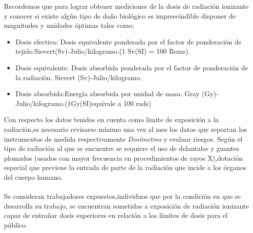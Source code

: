 \documentclass[12pt,fleqn]{book} %
\numberwithin{equation}{section} %
\numberwithin{figure}{section} %
\numberwithin{table}{section} %
\begin{document}
{{}%
Recordemos que para lograr obtener mediciones de la dosis de radiación ionizante y conocer si existe algún tipo de  daño biológico es imprescindible 
disponer  de magnitudes y  unidades óptimas tales como;
\begin{itemize}
 \item 
Dosis efectiva: Dosis equivalente ponderada por el factor de ponderación de tejido.Sievert(Sv)-Julio/kilogramo.(1 Sv(SI) = 100 Rems). 
\item 
Dosis equivalente: Dosis absorbida ponderada por el factor de ponderación de la radiación. Sievert (Sv)-Julio/kilogramo.
\item 
Dosis absorbida:Energía absorbida por unidad de masa. Gray (Gy)-Julio/kilogramo.(1Gy(SI)equivale a 100 rads)
\end{itemize}

Con respecto los datos tenidos en cuenta como limite de exposición a la radiación,es necesario revisarse mínimo una vez al mes los datos que reportan los instrumentos de medida respectivamente \textit{Dosímetros} y evaluar riesgos.
Según  el tipo de  radiación al que se encuentre se requiere el uso de  delantales y guantes plomados (usados con mayor frecuencia en procedimientos de rayos X),dotación especial que previene la entrada de parte de la  radiación que incide a los órganos del  cuerpo humano.
\\\\
Se consideran trabajadores expuestos,individuos que por la condición en que se desarrolla su trabajo, se encuentran sometidas a exposición de radiación ionizante capaz de entrañar dosis superiores en relación a los límites de dosis para el público. 
% 
% 
\newpage

}
\end{document}

